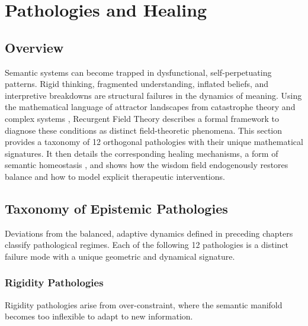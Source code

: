 \chapter{Pathologies and Healing}

\section{Overview}

Semantic systems can become trapped in dysfunctional, self-perpetuating patterns. Rigid thinking, fragmented understanding, inflated beliefs, and interpretive breakdowns are structural failures in the dynamics of meaning. Using the mathematical language of attractor landscapes from catastrophe theory and complex systems \autocite{Thom1975, Zeeman1977, Milnor1985}, Recurgent Field Theory describes a formal framework to diagnose these conditions as distinct field-theoretic phenomena. This section provides a taxonomy of 12 orthogonal pathologies with their unique mathematical signatures. It then details the corresponding healing mechanisms, a form of semantic homeostasis \autocite{Cannon1932}, and shows how the wisdom field endogenously restores balance and how to model explicit therapeutic interventions.

\section{Taxonomy of Epistemic Pathologies}

Deviations from the balanced, adaptive dynamics defined in preceding chapters classify pathological regimes. Each of the following 12 pathologies is a distinct failure mode with a unique geometric and dynamical signature.

\subsection{Rigidity Pathologies}

Rigidity pathologies arise from over-constraint, where the semantic manifold becomes too inflexible to adapt to new information.


